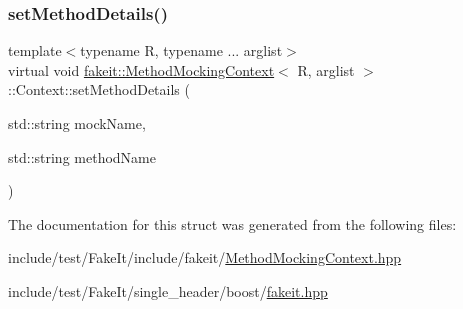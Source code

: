 \mbox{\label{structfakeit_1_1MethodMockingContext_1_1Context_a9eb0cf6ed84ea4bd63333503bd6bdc1a}} 
\subsubsection{\texorpdfstring{setMethodDetails()}{setMethodDetails()}\hspace{0.1cm}{\footnotesize\ttfamily [9/9]}}
{\footnotesize\ttfamily template$<$typename R, typename ... arglist$>$ \\
virtual void \mbox{\hyperlink{classfakeit_1_1MethodMockingContext}{fakeit\+::\+Method\+Mocking\+Context}}$<$ R, arglist $>$\+::Context\+::set\+Method\+Details (\begin{DoxyParamCaption}\item[{std\+::string}]{mock\+Name,  }\item[{std\+::string}]{method\+Name }\end{DoxyParamCaption})\hspace{0.3cm}{\ttfamily [pure virtual]}}



The documentation for this struct was generated from the following files\+:\begin{DoxyCompactItemize}
\item 
include/test/\+Fake\+It/include/fakeit/\mbox{\hyperlink{MethodMockingContext_8hpp}{Method\+Mocking\+Context.\+hpp}}\item 
include/test/\+Fake\+It/single\+\_\+header/boost/\mbox{\hyperlink{single__header_2boost_2fakeit_8hpp}{fakeit.\+hpp}}\end{DoxyCompactItemize}
